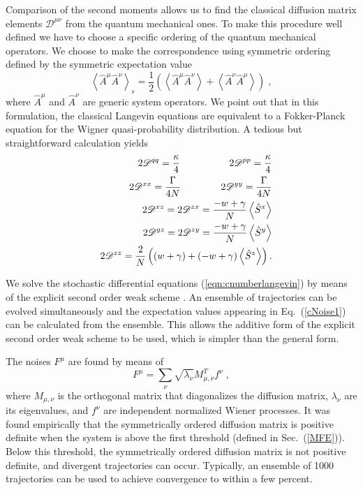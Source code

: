 \documentclass[aps,
twocolumn,
showpacs,
superscriptaddress,groupedaddress]{revtex4}
\begin{document}
Comparison of the second moments allows us to find the classical
diffusion matrix elements $\mathscr{D}^{\mu \nu}$ from the quantum
mechanical ones.  To make this procedure well defined we have to choose
a specific ordering of the quantum mechanical operators.  We choose to
make the correspondence using symmetric ordering defined by the
symmetric expectation value
\begin{equation}
\left< \hat{A}^{\mu} \hat{A}^{\nu} \right>_s=
\frac{1}{2} \left( \left< \hat{A}^{\mu} \hat{A}^{\nu} \right> + \left<
\hat{A}^{\nu} \hat{A}^{\mu} \right> \right)\;,
\end{equation}
where $\hat{A}^{\mu}$ and $\hat{A}^{\nu}$ are generic system operators.
We point out that in this formulation, the classical Langevin equations
are equivalent to a Fokker-Planck equation for the Wigner
quasi-probability distribution.  A tedious but straightforward
calculation yields
\begin{eqnarray}
&& 2\mathscr{D}^{q q}=
\frac{\kappa}{4} \hspace{0.7in} 2\mathscr{D}^{p p}=
\frac{\kappa}{4} \nonumber \\
&& 2\mathscr{D}^{xx}=
\frac{\Gamma}{4N} \hspace{0.57in} 2\mathscr{D}^{yy}=
\frac{\Gamma}{4N} \nonumber \\
&& 2\mathscr{D}^{xz}=
2\mathscr{D}^{zx}=
\frac{-w+\gamma}{N} \left< \hat{S}^{x} \right>  \nonumber \\
&& 2\mathscr{D}^{yz}=
2\mathscr{D}^{zy}=
\frac{-w+\gamma}{N} \left< \hat{S}^{y} \right>  \nonumber \\
&& 2\mathscr{D}^{zz}=
\frac{2}{N}\left((w+\gamma) + (-w+\gamma)  \left< \hat{S}^{z} \right> \right).
\label{cNoise1}
\end{eqnarray}

We solve the stochastic differential equations
(\ref{eqn:cnumberlangevin}) by means of the explicit second order weak scheme \cite{kloeden2011numerical}. An ensemble of trajectories can be evolved simultaneously and the expectation values appearing in Eq.~(\ref{cNoise1}) can be calculated from the ensemble. This allows the additive form of the explicit second order weak scheme to be used, which is simpler than the general form.

The noises $F^\mu$ are found by means of
\begin{equation}
F^\mu=\sum_\nu \sqrt{\lambda_\nu} M_{\mu,\nu}^T f^\nu\;,
\end{equation}
where $M_{\mu,\nu}$ is the orthogonal matrix that
diagonalizes the diffusion matrix, $\lambda_\nu$ are its eigenvalues,
and $f^\nu$ are independent normalized Wiener processes.
It was found empirically that the symmetrically ordered diffusion matrix is positive definite when the system is above the first threshold (defined in Sec.~(\ref{MFE})). Below this threshold, the symmetrically ordered diffusion matrix is not positive definite, and divergent trajectories can occur. Typically, an ensemble of 1000 trajectories can be used to achieve convergence to within a few percent.
\end{document}
